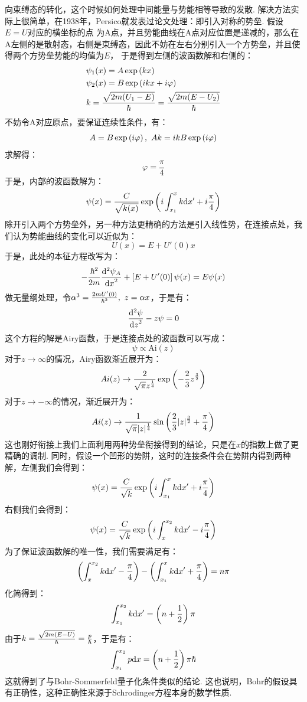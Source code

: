 向束缚态的转化，这个时候如何处理中间能量与势能相等导致的发散. 解决方法实际上很简单，在1938年，Persico就发表过论文处理：即引入对称的势垒. 假设\(E=U\)对应的横坐标的点
为A点，并且势能曲线在A点对应位置是递减的，那么在A左侧的是散射态，右侧是束缚态，因此不妨在左右分别引入一个方势垒，并且使得两个方势垒势能的均值为\(E\)，
于是得到左侧的波函数解和右侧的：
\begin{align*}
& \psi_{1}(x) = A\exp\left({kx}\right) \\
& \psi_{2}(x) = B\exp\left({ikx+i\varphi}\right) \\
& k = \frac{\sqrt{2m(U_{1}-E)}}{\hbar} = \frac{\sqrt{2m(E-U_{2})}}{\hbar}
\end{align*}
不妨令A对应原点，要保证连续性条件，有：
\[
A = B\exp\left({i\varphi}\right), \ Ak = ikB\exp\left({i\varphi}\right)
\]
求解得：
\[
\varphi = \frac{\pi}{4}
\]
于是，内部的波函数解为：
\[
\psi(x) = \frac{C}{\sqrt{k(x)}}\exp\left({i\int_{x_{1}}^{x}k\dd x' + i\frac{\pi}{4}}\right)
\]
除开引入两个方势垒外，另一种方法更精确的方法是引入线性势，在连接点处，我们认为势能曲线的变化可以近似为：
\[
U(x) = E + U'(0)x
\]
于是，此处的本征方程改写为：
\[
-\frac{\hbar^2}{2m}\frac{\dd^2{\psi_{A}}}{\dd{x}^2} + \left[{E+U'(0)}\right]\psi(x) = E\psi(x) 
\]
做无量纲处理，令\(\alpha^3 = \frac{2mU'(0)}{\hbar^2},\ z=\alpha x\)，于是有：
\[
\frac{\dd^2{\psi}}{\dd{z}^2} - z\psi = 0
\]
这个方程的解是Airy函数，于是连接点处的波函数可以写成：
\[
\psi \propto \mathrm{Ai}(z)
\]
对于\(z\to\infty\)的情况，Airy函数渐近展开为：
\[
Ai(z) \to \frac{2}{\sqrt{\pi}z^{\frac{1}{4}}}\exp\left({-\frac{2}{3}z^{\frac{3}{2}}}\right)
\]
对于\(z\to-\infty\)的情况，渐近展开为：
\[
Ai(z) \to \frac{1}{\sqrt{\pi}|z|^{\frac{1}{4}}}\sin\left({\frac{2}{3}|z|^{\frac{3}{2}} + \frac{\pi}{4}}\right)
\]
这也刚好衔接上我们上面利用两种势垒衔接得到的结论，只是在\(x\)的指数上做了更精确的调制. 同时，假设一个凹形的势阱，这时的连接条件会在势阱内得到两种解，左侧我们会得到：
\[
\psi(x) = \frac{C}{\sqrt{k}}\exp\left({i\int_{x_{1}}^{x}k\dd x' + i\frac{\pi}{4}}\right)
\]
右侧我们会得到：
\[
\psi(x) = \frac{C}{\sqrt{k}}\exp\left({i\int_{x}^{x_{2}}k\dd x' - i\frac{\pi}{4}}\right)
\]
为了保证波函数解的唯一性，我们需要满足有：
\[
\left({\int_{x}^{x_{2}}k\dd x' - \frac{\pi}{4}}\right) - \left({\int_{x_{1}}^{x}k\dd x' + \frac{\pi}{4}}\right) = n\pi
\]
化简得到：
\[
\int_{x_{1}}^{x_{2}}k\dd x' = \left({n+\frac{1}{2}}\right)\pi
\]
由于\(k=\frac{\sqrt{2m(E-U)}}{\hbar}=\frac{p}{\hbar}\)，于是有：
\[
\int_{x_{1}}^{x_{2}}p\dd x = \left({n+\frac{1}{2}}\right)\pi\hbar
\]
这就得到了与Bohr-Sommerfeld量子化条件类似的结论. 这也说明，Bohr的假设具有正确性，这种正确性来源于Schrodinger方程本身的数学性质. 